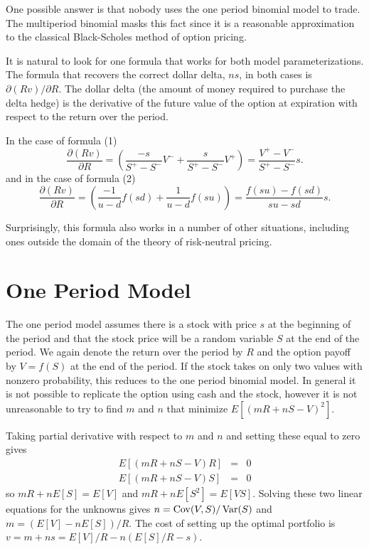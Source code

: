 \documentclass[12pt,fleqn]{amsart}
\newcommand{\Var}{\mathop{\rm Var}}
\newcommand{\Cov}{\mathop{\rm Cov}}
\begin{document}
One possible answer is that nobody uses the one period binomial
model to trade. The multiperiod binomial masks this fact since it is
a reasonable approximation to the classical Black-Scholes method of
option pricing.

It is natural to look for one formula that works for both model
parameterizations.  The formula that recovers the correct dollar delta,
$ns$, in both cases is $\partial (Rv)/\partial R$. The dollar delta (the
amount of money required to purchase the delta hedge) is the derivative
of the future value of the option at expiration with respect to the
return over the period.

In the case of formula (1)
\begin{equation*}
\frac{\partial(Rv)}{\partial R} = \left(\frac{-s}{S^+ - S^-} V^- 
		+ \frac{s}{S^+ - S^-} V^+\right) = \frac{V^+ - V^-}{S^+ - S^-}s.
\end{equation*}
and in the case of formula (2)
\begin{equation*}
\frac{\partial(Rv)}{\partial R} = \left(\frac{-1}{u - d} f(sd) 
		+ \frac{1}{u - d} f(su)\right) = \frac{f(su) - f(sd)}{su - sd}s.
\end{equation*}

Surprisingly, this formula also works in a number of other situations,
including ones outside the domain of the theory of risk-neutral pricing.

\section{One Period Model}

The one period model assumes there is a stock with price $s$ at the
beginning of the period and that the stock price will be a random
variable $S$ at the end of the period. We again denote the return over
the period by $R$ and the option payoff by $V = f(S)$ at the end of the
period. If the stock takes on only two values with nonzero probability,
this reduces to the one period binomial model. In general it is not
possible to replicate the option using cash and the stock, however it
is not unreasonable to try to find $m$ and $n$ that minimize
$E[(mR + nS - V)^2]$.

Taking partial derivative with respect to $m$ and $n$ and setting
these equal to zero gives
\begin{eqnarray*}
E[(mR + nS - V)R] &=& 0\\
E[(mR + nS - V)S] &=& 0
\end{eqnarray*}
so $mR + nE[S] = E[V]$ and $mR + nE[S^2] = E[VS]$. Solving these
two linear equations for the unknowns gives
$n = \Cov(V,S)/\Var(S)$ and $m = (E[V] - nE[S])/R$. The cost of
setting up the optimal portfolio is $v = m + ns = E[V]/R - n(E[S]/R -
s)$.
\end{document}
